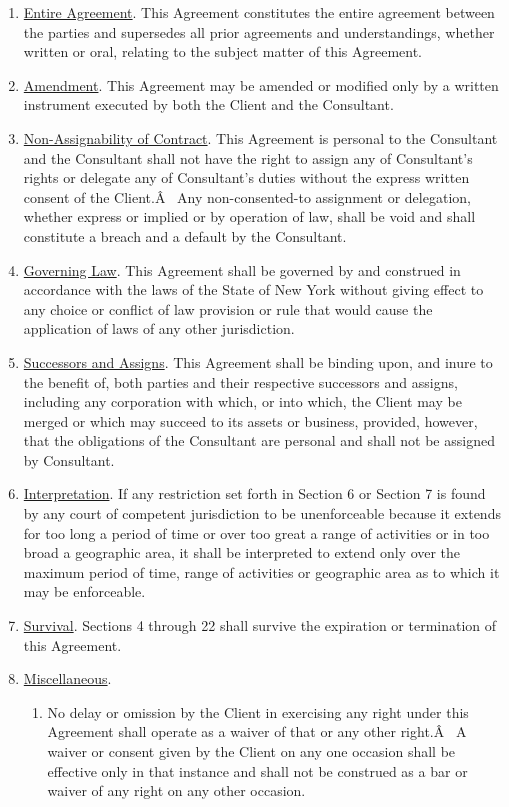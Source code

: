 \documentclass[12pt]{article}
\begin{document}
\begin{enumerate}
    \item \underline{Entire Agreement}. This Agreement constitutes the entire agreement between the parties and supersedes all prior agreements and understandings, whether written or oral, relating to the subject matter of this Agreement.
    \item \underline{Amendment}. This Agreement may be amended or modified only by a written instrument executed by both the Client and the Consultant.
    \item \underline{Non-Assignability of Contract}. This Agreement is personal to the Consultant and the Consultant shall not have the right to assign any of Consultant's rights or delegate any of Consultant's duties without the express written consent of the Client.Â  Any non-consented-to assignment or delegation, whether express or implied or by operation of law, shall be void and shall constitute a breach and a default by the Consultant.
    \item \underline{Governing Law}.
    This Agreement shall be governed by and construed in accordance with the laws of the State of New York without giving effect to any choice or conflict of law provision or rule that would cause the application of laws of any other jurisdiction.
    \item \underline{Successors and Assigns}. This Agreement shall be binding upon, and inure to the benefit of, both parties and their respective successors and assigns, including any corporation with which, or into which, the Client may be merged or which may succeed to its assets or business, provided, however, that the obligations of the Consultant are personal and shall not be assigned by Consultant.
    \item \underline{Interpretation}. If any restriction set forth in Section 6 or Section 7 is found by any court of competent jurisdiction to be unenforceable because it extends for too long a period of time or over too great a range of activities or in too broad a geographic area, it shall be interpreted to extend only over the maximum period of time, range of activities or geographic area as to which it may be enforceable.
    \item \underline{Survival}. Sections 4 through 22 shall survive the expiration or termination of this Agreement.
    \item \underline{Miscellaneous}.
    \begin{enumerate}
        \item No delay or omission by the Client in exercising any right under this Agreement shall operate as a waiver of that or any other right.Â  A waiver or consent given by the Client on any one occasion shall be effective only in that instance and shall not be construed as a bar or waiver of any right on any other occasion.

\end{enumerate}
\end{enumerate}
\end{document}
